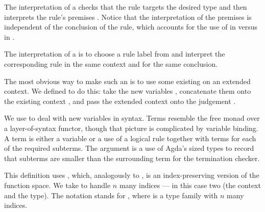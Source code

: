 
The interpretation of a  checks that the rule targets
the desired type and then interprets the rule's premises
.  Notice that the interpretation of the premises is
independent of the conclusion of the rule, which accounts for the use
of  in
 versus
 in .


The interpretation of a  is to choose a rule label
 from  and interpret the corresponding rule
\AgdaSpace{} in the same context and for the same
conclusion.


The most obvious way to make such an  is to use some existing
 on an extended context.
We defined  to do this: take the new variables
\AgdaBound{$\Delta$}, concatenate them onto the existing context
\AgdaBound{$\Gamma$}, and pass the extended context onto the judgement
.



We use  to deal with new variables in syntax.
Terms resemble the free monad over a layer-of-syntax functor, though
that picture is complicated by variable binding.  A term is either a
variable or a use of a logical rule together with terms for each of
the required subterms. The  argument is a use of
Agda's sized types to record that subterms are smaller than the
surrounding term for the termination checker.


This definition uses \AgdaFunction{$\dotto$}, which, analogously to
\AgdaFunction{$\dottimes$}, is an index-preserving version of the function
space.
We take \AgdaFunction{$\dotto$} to handle $n$ many indices --- in this
case two (the context and the type).
The notation
\AgdaFunction{$\forall[$}\AgdaSpace{}\AgdaSpace{}\AgdaFunction{]}
stands for
\AgdaSymbol{$\forall$}\AgdaSpace{}\AgdaSymbol{\{}%
\AgdaSpace{}\AgdaSymbol{$\ldots$}\AgdaSpace{}%
\AgdaSymbol{\}}\AgdaSpace{}\AgdaSymbol{$\to$}\AgdaSpace{}%
\AgdaSpace{}%
\AgdaSpace{}\AgdaSymbol{$\ldots$}\AgdaSpace{},
where  is a type family with $n$ many indices.

